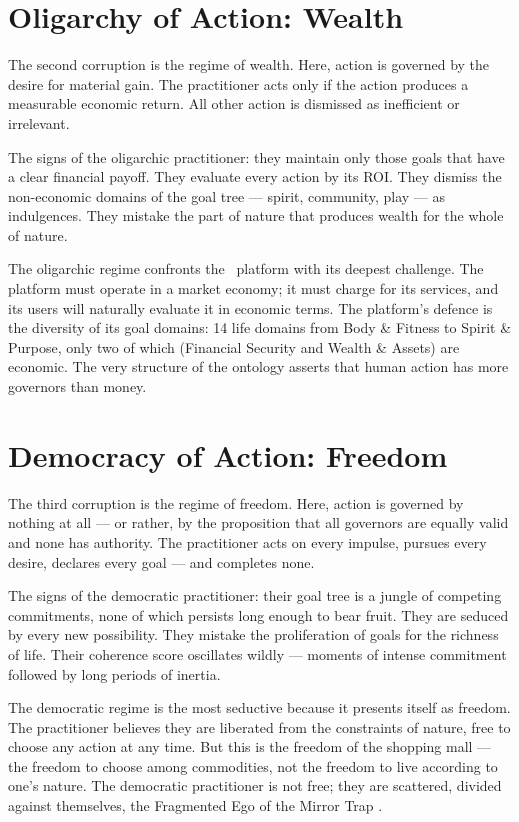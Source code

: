 \section{Oligarchy of Action: Wealth}

The second corruption is the regime of wealth. Here, action is governed by the
desire for material gain. The practitioner acts only if the action produces a
measurable economic return. All other action is dismissed as inefficient or
irrelevant.

The signs of the oligarchic practitioner: they maintain only those goals that
have a clear financial payoff. They evaluate every action by its ROI. They
dismiss the non-economic domains of the goal tree --- spirit, community, play
--- as indulgences. They mistake the part of nature that produces wealth for
the whole of nature.

The oligarchic regime confronts the \praxis\ platform with its deepest
challenge. The platform must operate in a market economy; it must charge for
its services, and its users will naturally evaluate it in economic terms. The
platform's defence is the diversity of its goal domains: 14 life domains from
Body \& Fitness to Spirit \& Purpose, only two of which (Financial Security and
Wealth \& Assets) are economic. The very structure of the ontology asserts that
human action has more governors than money.

\section{Democracy of Action: Freedom}

The third corruption is the regime of freedom. Here, action is governed by
nothing at all --- or rather, by the proposition that all governors are equally
valid and none has authority. The practitioner acts on every impulse, pursues
every desire, declares every goal --- and completes none.

The signs of the democratic practitioner: their goal tree is a jungle of
competing commitments, none of which persists long enough to bear fruit. They
are seduced by every new possibility. They mistake the proliferation of goals
for the richness of life. Their coherence score oscillates wildly --- moments
of intense commitment followed by long periods of inertia.

The democratic regime is the most seductive because it presents itself as
freedom. The practitioner believes they are liberated from the constraints of
nature, free to choose any action at any time. But this is the freedom of the
shopping mall --- the freedom to choose among commodities, not the freedom to
live according to one's nature. The democratic practitioner is not free; they
are scattered, divided against themselves, the Fragmented Ego of the Mirror
Trap \parencite{macintyre1981virtue}.


